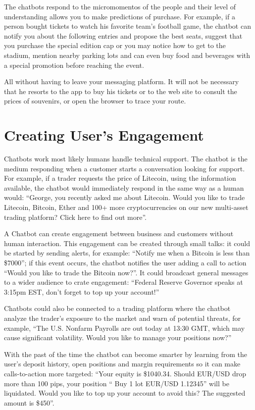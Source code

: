 \documentclass[	DIV=calc,%
							paper=letter,%
							fontsize=12pt%
                            ]{scrartcl}	 					%
\begin{document}
The chatbots respond to the micromomentos of the people and their level of understanding allows you to make predictions of purchase. For example, if a person bought tickets to watch his favorite team's football game, the chatbot can notify you about the following entries and propose the best seats, suggest that you purchase the special edition cap or you may notice how to get to the stadium, mention nearby parking lots and can even buy food and beverages with a special promotion before reaching the event.

All without having to leave your messaging platform. It will not be necessary that he resorts to the app to buy his tickets or to the web site to consult the prices of souvenirs, or open the browser to trace your route.



\section{\label{sec:level1}Creating User’s Engagement}
Chatbots work most likely humans handle technical support. The chatbot is the medium responding when a customer starts a conversation looking for support. For example, if a trader requests the price of Litecoin, using the information available, the chatbot would immediately respond in the same way as a human would: “George, you recently asked me about Litecoin. Would you like to trade Litecoin, Bitcoin, Ether and 100+ more cryptocurrencies on our new multi-asset trading platform? Click here to find out more”.

A Chatbot can create engagement between business and customers without human interaction. This engagement can be created through small talks: it could be started by sending alerts, for example: “Notify me when a Bitcoin is less than \$7000”; if this event occurs, the chatbot notifies the user adding a call to action “Would you like to trade the Bitcoin now?”. It could broadcast general messages to a wider audience to crate engagement: “Federal Reserve Governor speaks at 3:15pm EST, don’t forget to top up your account!”

Chatbots could also be connected to a trading platform where the chatbot analyze the trader’s exposure to the market and warn of potential threats, for example, “The U.S. Nonfarm Payrolls are out today at 13:30 GMT, which may cause significant volatility. Would you like to manage your positions now?”
 
With the past of the time the chatbot can become smarter by learning from the user’s deposit history, open positions and margin requirements so it can make calls-to-action more targeted: “Your equity is \$1040.34. Should EUR/USD drop more than 100 pips, your position “ Buy 1 lot EUR/USD \@ 1.12345” will be liquidated. Would you like to top up your account to avoid this? The suggested amount is \$450”.
\end{document}
